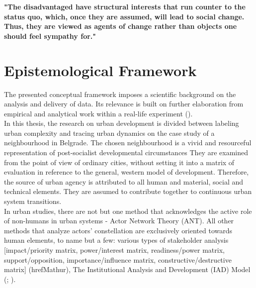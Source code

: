 \documentclass[11pt]{report}
\begin{document}
\textbf{"The disadvantaged have structural interests that run counter to the status quo, which, once they are assumed, will lead to social change. Thus, they are viewed as agents of change rather than objects one should feel sympathy for." \citealt{Sears 2008}}

\section{Epistemological Framework}
The presented conceptual framework imposes a scientific background on the analysis and delivery of data.
Its relevance is built on further elaboration from empirical and analytical work within a real-life experiment (\href{Parnell}{\citealt{parnell_retheorizing_2012}}).
\\

In this thesis, the research on urban development is divided between labeling urban complexity and tracing urban dynamics on the case study of a neighbourhood in Belgrade.
The chosen neighbourhood is a vivid and resourceful representation of post-socialist developmental circumstances
They are examined from the point of view of ordinary cities, without setting it into a matrix of evaluation in reference to the general, western model of development.
Therefore, the source of urban agency is attributed to 
all human and material, social and technical elements. They are assumed to contribute together to continuous urban system transitions.
\\

In urban studies, there are not but one method that acknowledges the active role of non-humans in urban systems - Actor Network Theory (ANT).
All other methods that analyze actors' constellation are exclusively oriented towards human elements, to name but a few: various types of stakeholder analysis [impact/priority matrix, power/interest matrix, readiness/power matrix, support/opposition, importance/influence matrix,
constructive/destructive matrix] (href{Mathur}{\citealt{mathur_defining_2007}}), The Institutional Analysis and Development (IAD) Model (\href{Ostrom}{\citealt{ostrom_governing_1995}}; \href{Ostrom}{\citealt{ostrom_upravljanje_2006}}).
\\
\end{document}

